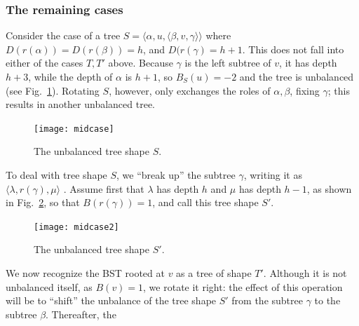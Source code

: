 \documentclass[a4paper]{book}
\theoremstyle{changebreak}                %
\begin{document}
\subsubsection{The remaining cases}
Consider the case of a tree
$S=\langle\alpha,u,\langle\beta,v,\gamma\rangle\rangle$ where
$D(r(\alpha))=D(r(\beta))=h$, and $D(r(\gamma)=h+1$. This does not
fall into either of the cases $T,T'$ above. Because $\gamma$ is the
left subtree of $v$, it has depth $h+3$, while the
depth of $\alpha$ is $h+1$, so $B_S(u)=-2$ and the tree is unbalanced
(see Fig.~\ref{f:rc}). Rotating $S$, however,
only exchanges the roles of $\alpha,\beta$, fixing $\gamma$; this
results in another unbalanced tree.
\begin{figure}[!ht]
\begin{center}
\begin{center}
\texttt{[image: midcase]}
\end{center}
\end{center}
\caption{The unbalanced tree shape $S$.}
\label{f:rc}
\end{figure}
To deal with tree shape $S$, we ``break up'' the subtree $\gamma$,
writing it as $\langle\lambda,r(\gamma),\mu\rangle$ . Assume first
that $\lambda$ has depth $h$ and $\mu$ has depth $h-1$, as shown in
Fig.~\ref{f:remcase}, so that $B(r(\gamma))=1$, and call this tree
shape $S'$.
\begin{figure}[!ht]
\begin{center}
\texttt{[image: midcase2]}
\end{center}
\caption{The unbalanced tree shape $S'$.}
\label{f:remcase}
\end{figure}
We now recognize the BST rooted at $v$ as a tree of
shape $T'$. Although it is not
unbalanced itself, as $B(v)=1$, we rotate it
right: the effect of this operation will be to
``shift'' the unbalance of the tree shape $S'$ from the subtree
$\gamma$ to the subtree $\beta$. Thereafter, the
\end{document}
